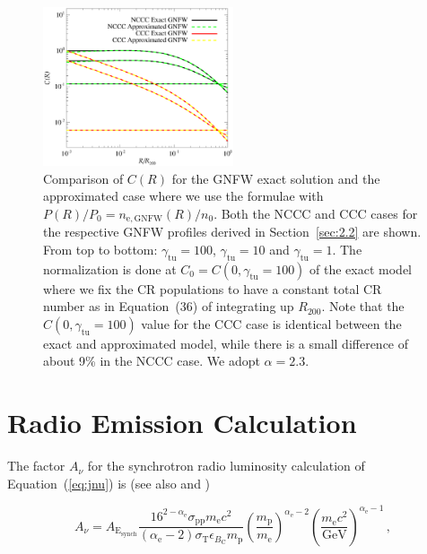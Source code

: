\documentclass[traditabstract]{aa}
\newcommand{\rmn}{\mathrm}
\begin{document}
\begin{appendix}
\begin{figure}[t!]
\centering
\includegraphics[width=0.5\textwidth]{figures/CR_profiles_REXexactVSfake.eps}
\caption{Comparison of $C(R)$ for the GNFW exact solution and the approximated case where we use the \cite{2011A&A...527A..99E} formulae with $P(R)/P_{0}=n_{\rmn{e,GNFW}}(R)/n_{0}$. Both the NCCC and CCC cases for the respective GNFW profiles derived in Section~\ref{sec:2.2} are shown. From top to bottom: $\gamma_{\rmn{tu}}=100$, $\gamma_{\rmn{tu}}=10$ and $\gamma_{\rmn{tu}}=1$. The normalization is done at $C_{0}=C(0,\gamma_{\rmn{tu}}=100)$ of the exact model where we fix the CR populations to have a constant total CR number as in Equation~(36) of \cite{2011A&A...527A..99E} integrating up $R_{200}$. Note that the $C(0,\gamma_{\rmn{tu}}=100)$ value for the CCC case is identical between the exact and approximated model, while there is a small difference of about 9\% in the NCCC case. We adopt $\alpha=2.3$.}
\label{fig:REXexactVSfake}
\end{figure}



\section{Radio Emission Calculation}
\label{app:A}

The factor $A_{\nu}$ for the synchrotron radio luminosity calculation of Equation~(\ref{eq:jnu}) is (see also \citealp{2008MNRAS.385.1211P} and \citealp{2011A&A...527A..99E})

\begin{equation}
A_{\nu} = A_{\rmn{E_{synch}}} \frac{16^{2-\alpha_{\rmn{e}}}\sigma_{\rmn{pp}}m_{\rmn{e}}c^{2}}{(\alpha_{\rmn{e}}-2)\sigma_{\rmn{T}}\epsilon_{B_{\rmn{C}}}m_{\rmn{p}}}\left(\frac{m_{\rmn{p}}
}{m_{\rmn{e}}}\right)^{\alpha_{\rmn{e}}-2} \left(\frac{m_{\rmn{e}}c^{2}}{\rmn{GeV}}\right)^{\alpha_{\rmn{e}}-1} \, ,
\end{equation}


\end{appendix}
\end{document}

